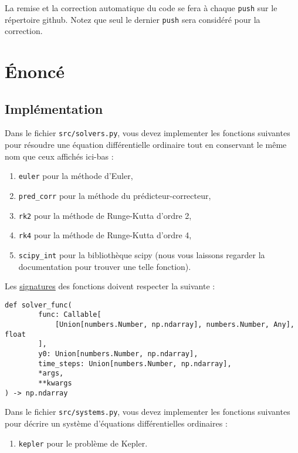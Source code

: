 \documentclass[12pt, letterpaper]{article}
\begin{document}
\bigskip

\noindent La remise et la correction automatique du code se fera à chaque \texttt{push} sur le répertoire github.
Notez que seul le dernier \texttt{push} sera considéré pour la correction.


\section{Énoncé}\label{sec:enonce}

\subsection{Implémentation}\label{subsec:implementation}

\noindent Dans le fichier \texttt{src/solvers.py}, vous devez implementer les fonctions suivantes pour résoudre une
équation différentielle ordinaire tout en conservant le même nom que ceux affichés ici-bas :
\begin{enumerate}
  \item \texttt{euler} pour la méthode d'Euler,
  \item \texttt{pred\_corr} pour la méthode du prédicteur-correcteur,
  \item \texttt{rk2} pour la méthode de Runge-Kutta d'ordre 2,
  \item \texttt{rk4} pour la méthode de Runge-Kutta d'ordre 4,
  \item \texttt{scipy\_int} pour la bibliothèque scipy
  (nous vous laissons regarder la documentation pour trouver une telle fonction). 
\end{enumerate}

\bigskip

\noindent Les \href{https://python-forge.readthedocs.io/en/latest/signature.html}{signatures} des fonctions doivent
respecter la suivante :
\begin{verbatim}
def solver_func(
        func: Callable[
            [Union[numbers.Number, np.ndarray], numbers.Number, Any], float
        ],
        y0: Union[numbers.Number, np.ndarray],
        time_steps: Union[numbers.Number, np.ndarray],
        *args,
        **kwargs
) -> np.ndarray
\end{verbatim}

\bigskip

\noindent Dans le fichier \texttt{src/systems.py}, vous devez implementer les fonctions suivantes pour décrire un
système d'équations différentielles ordinaires :
\begin{enumerate}
  \item \texttt{kepler} pour le problème de Kepler.
\end{enumerate}
\end{document}
